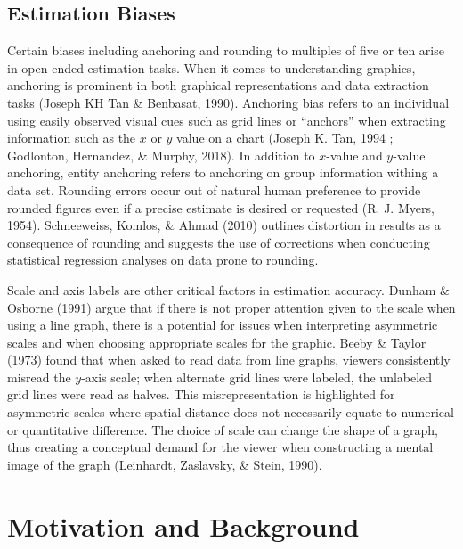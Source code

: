 \documentclass[print]{nuthesis}
\begin{document}
\hypertarget{estimation-biases}{%
\subsection{Estimation Biases}\label{estimation-biases}}

Certain biases including anchoring and rounding to multiples of five or ten arise in open-ended estimation tasks.
When it comes to understanding graphics, anchoring is prominent in both graphical representations and data extraction tasks (Joseph KH Tan \& Benbasat, 1990).
Anchoring bias refers to an individual using easily observed visual cues such as grid lines or ``anchors'' when extracting information such as the \(x\) or \(y\) value on a chart (Joseph K. Tan, 1994 ; Godlonton, Hernandez, \& Murphy, 2018).
In addition to \(x\)-value and \(y\)-value anchoring, entity anchoring refers to anchoring on group information withing a data set.
Rounding errors occur out of natural human preference to provide rounded figures even if a precise estimate is desired or requested (R. J. Myers, 1954).
Schneeweiss, Komlos, \& Ahmad (2010) outlines distortion in results as a consequence of rounding and suggests the use of corrections when conducting statistical regression analyses on data prone to rounding.

Scale and axis labels are other critical factors in estimation accuracy.
Dunham \& Osborne (1991) argue that if there is not proper attention given to the scale when using a line graph, there is a potential for issues when interpreting asymmetric scales and when choosing appropriate scales for the graphic.
Beeby \& Taylor (1973) found that when asked to read data from line graphs, viewers consistently misread the \(y\)-axis scale; when alternate grid lines were labeled, the unlabeled grid lines were read as halves.
This misrepresentation is highlighted for asymmetric scales where spatial distance does not necessarily equate to numerical or quantitative difference.
The choice of scale can change the shape of a graph, thus creating a conceptual demand for the viewer when constructing a mental image of the graph (Leinhardt, Zaslavsky, \& Stein, 1990).

\hypertarget{motivation-and-background}{%
\section{Motivation and Background}\label{motivation-and-background}}
\end{document}
